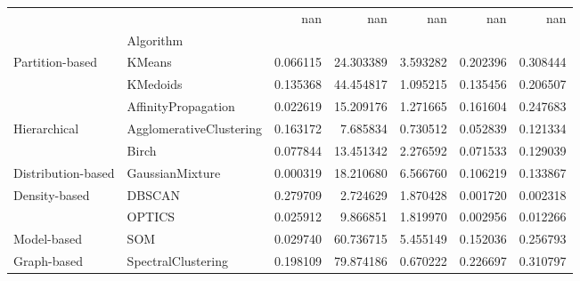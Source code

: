 \begin{tabular}{llrrrrr}
 &  & nan & nan & nan & nan & nan \\
 & Algorithm &  &  &  &  &  \\
\multirow[c]{3}{*}{Partition-based} & KMeans & 0.066115 & 24.303389 & 3.593282 & 0.202396 & 0.308444 \\
 & KMedoids & 0.135368 & 44.454817 & 1.095215 & 0.135456 & 0.206507 \\
 & AffinityPropagation & 0.022619 & 15.209176 & 1.271665 & 0.161604 & 0.247683 \\
\multirow[c]{2}{*}{Hierarchical} & AgglomerativeClustering & 0.163172 & 7.685834 & 0.730512 & 0.052839 & 0.121334 \\
 & Birch & 0.077844 & 13.451342 & 2.276592 & 0.071533 & 0.129039 \\
Distribution-based & GaussianMixture & 0.000319 & 18.210680 & 6.566760 & 0.106219 & 0.133867 \\
\multirow[c]{2}{*}{Density-based} & DBSCAN & 0.279709 & 2.724629 & 1.870428 & 0.001720 & 0.002318 \\
 & OPTICS & 0.025912 & 9.866851 & 1.819970 & 0.002956 & 0.012266 \\
Model-based & SOM & 0.029740 & 60.736715 & 5.455149 & 0.152036 & 0.256793 \\
Graph-based & SpectralClustering & 0.198109 & 79.874186 & 0.670222 & 0.226697 & 0.310797 \\
\end{tabular}
